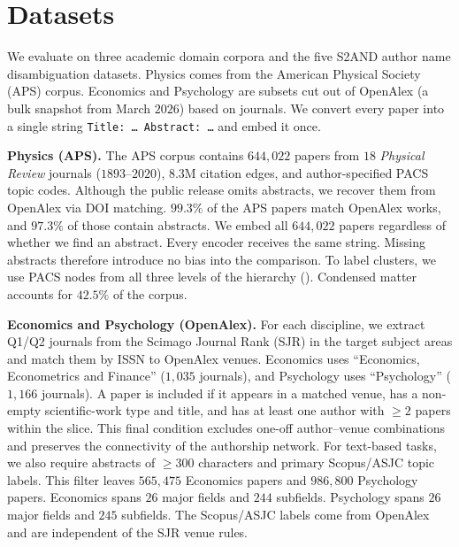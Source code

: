 \section{Datasets}
\label{app:data}

We evaluate on three academic domain corpora and the five S2AND author name disambiguation datasets.
Physics comes from the American Physical Society (APS) corpus.
Economics and Psychology are subsets cut out of OpenAlex (a bulk snapshot from March $2026$) based on journals.
We convert every paper into a single string \texttt{Title: \ldots{} Abstract: \ldots} and embed it once.

\textbf{Physics (APS).}
The APS corpus contains $644{,}022$ papers from $18$ \emph{Physical Review} journals ($1893$--$2020$), $8.3$M citation edges, and author-specified PACS topic codes.
Although the public release omits abstracts, we recover them from OpenAlex via DOI matching.
$99.3\%$ of the APS papers match OpenAlex works, and $97.3\%$ of those contain abstracts.
We embed all $644{,}022$ papers regardless of whether we find an abstract.
Every encoder receives the same string.
Missing abstracts therefore introduce no bias into the comparison.
To label clusters, we use PACS nodes from all three levels of the hierarchy ().
Condensed matter accounts for $42.5\%$ of the corpus.

\textbf{Economics and Psychology (OpenAlex).}
For each discipline, we extract Q1/Q2 journals from the Scimago Journal Rank (SJR) in the target subject areas and match them by ISSN to OpenAlex venues.
Economics uses ``Economics, Econometrics and Finance'' ($1{,}035$ journals), and Psychology uses ``Psychology'' ($1{,}166$ journals).
A paper is included if it appears in a matched venue, has a non-empty scientific-work type and title, and has at least one author with $\ge 2$ papers within the slice.
This final condition excludes one-off author--venue combinations and preserves the connectivity of the authorship network.
For text-based tasks, we also require abstracts of $\ge 300$ characters and primary Scopus/ASJC topic labels.
This filter leaves $565{,}475$ Economics papers and $986{,}800$ Psychology papers.
Economics spans $26$ major fields and $244$ subfields.
Psychology spans $26$ major fields and $245$ subfields.
The Scopus/ASJC labels come from OpenAlex and are independent of the SJR venue rules.

